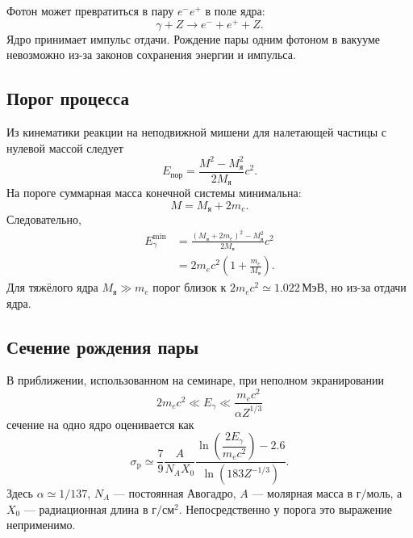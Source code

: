 \documentclass[../final.tex]{subfiles}
\begin{document}


Фотон может превратиться в пару $e^-e^+$ в поле ядра:
\begin{equation*}
    \gamma+Z \longrightarrow e^-+e^++Z.
\end{equation*}
Ядро принимает импульс отдачи. Рождение пары одним фотоном в вакууме
невозможно из-за законов сохранения энергии и импульса.

\subsection*{Порог процесса}

Из кинематики реакции на неподвижной мишени для налетающей частицы
с нулевой массой следует
\begin{equation*}
    E_{\text{пор}}=\frac{M^2-M_{\text{я}}^2}{2M_{\text{я}}}c^2.
\end{equation*}
На пороге суммарная масса конечной системы минимальна:
\begin{equation*}
    M=M_{\text{я}}+2m_e.
\end{equation*}
Следовательно,
\begin{align*}
    E_\gamma^{\min}
    &=\frac{(M_{\text{я}}+2m_e)^2-M_{\text{я}}^2}
    {2M_{\text{я}}}c^2 \\
    &=2m_ec^2\left(1+\frac{m_e}{M_{\text{я}}}\right).
\end{align*}
Для тяжёлого ядра $M_{\text{я}}\gg m_e$ порог близок к
$2m_ec^2\simeq1.022\,\text{МэВ}$, но 
из-за отдачи ядра.

\subsection*{Сечение рождения пары}

В приближении, использованном на семинаре, при неполном экранировании
\begin{equation*}
    2m_ec^2\ll E_\gamma\ll\frac{m_ec^2}{\alpha Z^{1/3}}
\end{equation*}
сечение на одно ядро оценивается как
\begin{equation*}
    \sigma_{\mathrm p}\simeq
    \frac79\frac{A}{N_AX_0}
    \frac{\ln\!\left(\dfrac{2E_\gamma}{m_ec^2}\right)-2.6}
    {\ln\!\left(183Z^{-1/3}\right)}.
\end{equation*}
Здесь $\alpha\simeq1/137$, $N_A$ --- постоянная Авогадро,
$A$ --- молярная масса в $\text{г}/\text{моль}$,
а $X_0$ --- радиационная длина в $\text{г}/\text{см}^2$.
Непосредственно у порога это выражение неприменимо.
\end{document}
